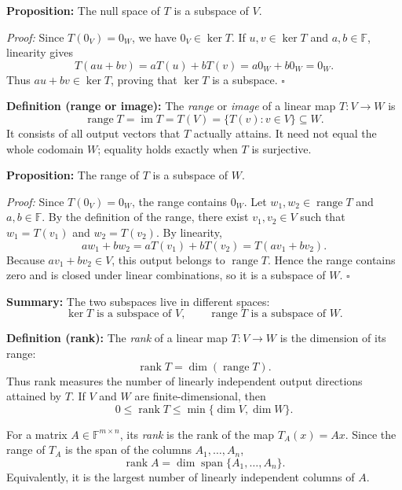 \documentclass[a4paper,11pt,abstract=true]{scrartcl}
\theoremstyle{dotlessP}
\theoremstyle{dotlessS}
\theoremstyle{remark}
\theoremstyle{definition}
\begin{document}
\begin{claim_box}
\textbf{Proposition:} The null space of $T$ is a subspace of $V$.

\textit{Proof:} Since $T(0_V)=0_W$, we have $0_V\in\ker T$.
If $u,v\in\ker T$ and $a,b\in\mathbb{F}$, linearity gives
\[
T(au+bv)=aT(u)+bT(v)=a0_W+b0_W=0_W.
\]
Thus $au+bv\in\ker T$, proving that $\ker T$ is a subspace.
\hfill$\square$
\end{claim_box}

\begin{definition_box}
\textbf{Definition (range or image):} The \emph{range} or
\emph{image} of a linear map $T:V\longrightarrow W$ is
\[
\operatorname{range}T=\operatorname{im}T=T(V)
=\{T(v):v\in V\}\subseteq W.
\]
It consists of all output vectors that $T$ actually attains. It need not
equal the whole codomain $W$; equality holds exactly when $T$ is surjective.
\end{definition_box}

\begin{claim_box}
\textbf{Proposition:} The range of $T$ is a subspace of $W$.

\textit{Proof:} Since $T(0_V)=0_W$, the range contains $0_W$.
Let $w_1,w_2\in\operatorname{range}T$ and $a,b\in\mathbb{F}$.
By the definition of the range, there exist $v_1,v_2\in V$ such that
$w_1=T(v_1)$ and $w_2=T(v_2)$. By linearity,
\[
aw_1+bw_2=aT(v_1)+bT(v_2)=T(av_1+bv_2).
\]
Because $av_1+bv_2\in V$, this output belongs to
$\operatorname{range}T$. Hence the range contains zero and is closed under
linear combinations, so it is a subspace of $W$. \hfill$\square$
\end{claim_box}

\begin{claim_box}
\textbf{Summary:} The two subspaces live in different spaces:
\[
\ker T\text{ is a subspace of }V,
\qquad
\operatorname{range}T\text{ is a subspace of }W.
\]
\end{claim_box}

\begin{definition_box}
\textbf{Definition (rank):} The \emph{rank} of a linear map
$T:V\longrightarrow W$ is the dimension of its range:
\[
\operatorname{rank}T=\dim(\operatorname{range}T).
\]
Thus rank measures the number of linearly independent output directions
attained by $T$. If $V$ and $W$ are finite-dimensional, then
\[
0\leq\operatorname{rank}T\leq\min\{\dim V,\dim W\}.
\]

For a matrix $A\in\mathbb{F}^{m\times n}$, its \emph{rank} is the rank
of the map $T_A(x)=Ax$. Since the range of $T_A$ is the span of the
columns $A_1,\ldots,A_n$,
\[
\operatorname{rank}A
=\dim\operatorname{span}\{A_1,\ldots,A_n\}.
\]
Equivalently, it is the largest number of linearly independent columns
of $A$.
\end{definition_box}
\end{document}
